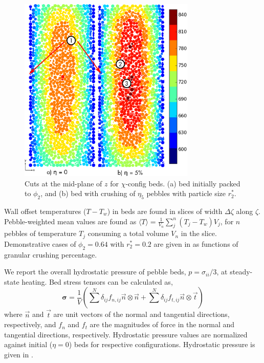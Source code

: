 \begin{figure}[!ht]
    \centering
    \includegraphics[width = 0.75\textwidth]{figures/x-64-discrete.eps}
    \caption{Cuts at the mid-plane of $z$ for $\chi$-config beds. (a) bed initially packed to $\phi_2$, and (b) bed with crushing of $\eta_5$ pebbles with particle size $r_2^*$.}\label{fig:3}
\end{figure}

Wall offset temperatures ($T-T_w$) in beds are found in slices of width $\Delta\zeta$ along $\zeta$. Pebble-weighted mean values are found as $\langle T\rangle = \frac{1}{V_n}\sum_{j}^n (T_j-T_w) V_j$, for $n$ pebbles of temperature $T_j$ consuming a total volume $V_n$ in the slice. Demonstrative cases of $\phi_2 = 0.64$ with $r_2^* = 0.2$ are given in  as functions of granular crushing percentage.

We report the overall hydrostatic pressure of pebble beds, $p = \sigma_{ii}/3$, at steady-state heating. Bed stress tensors can be calculated as\cite{Martin2004,Gan:2010uq,An20072233}, 
\begin{equation}
\bm{\sigma} = \frac{1}{V}\left(\sum^{N} \delta_{ij} f_{n,ij} \vec{n}\otimes\vec{n} + \sum^{N} \delta_{ij}f_{t,ij} \vec{n}\otimes\vec{t}\right)
\end{equation}
where $\vec{n}$ and $\vec{t}$ are unit vectors of the normal and tangential directions, respectively, and $f_n$ and $f_t$ are the magnitudes of force in the normal and tangential directions, respectively. Hydrostatic pressure values are normalized against initial ($\eta=0$) beds for respective configurations. Hydrostatic pressure is given in .%

